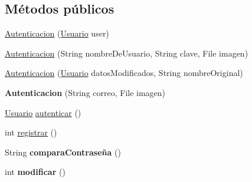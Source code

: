 \subsection*{Métodos públicos}
\begin{DoxyCompactItemize}
\item 
\hyperlink{classcom_1_1ucab_1_1javachat_1_1_servidor_1_1model_1_1_autenticacion_acf6d86eec7551760ec91cc2ad09b5e3d}{Autenticacion} (\hyperlink{classcom_1_1ucab_1_1javachat_1_1_servidor_1_1model_1_1_usuario}{Usuario} user)
\item 
\hyperlink{classcom_1_1ucab_1_1javachat_1_1_servidor_1_1model_1_1_autenticacion_ae16e9a2db61ce5528fc5d024dec17092}{Autenticacion} (String nombre\-De\-Usuario, String clave, File imagen)
\item 
\hyperlink{classcom_1_1ucab_1_1javachat_1_1_servidor_1_1model_1_1_autenticacion_a58448a0f8c2cd4186dc2bf97ef81e2f7}{Autenticacion} (\hyperlink{classcom_1_1ucab_1_1javachat_1_1_servidor_1_1model_1_1_usuario}{Usuario} datos\-Modificados, String nombre\-Original)
\item 
\hypertarget{classcom_1_1ucab_1_1javachat_1_1_servidor_1_1model_1_1_autenticacion_a73bb46aee6ae1f6741ebb4cf73763efc}{{\bfseries Autenticacion} (String correo, File imagen)}\label{classcom_1_1ucab_1_1javachat_1_1_servidor_1_1model_1_1_autenticacion_a73bb46aee6ae1f6741ebb4cf73763efc}

\item 
\hyperlink{classcom_1_1ucab_1_1javachat_1_1_servidor_1_1model_1_1_usuario}{Usuario} \hyperlink{classcom_1_1ucab_1_1javachat_1_1_servidor_1_1model_1_1_autenticacion_abd542a51e7aca4eb713e823a82b83673}{autenticar} ()
\item 
int \hyperlink{classcom_1_1ucab_1_1javachat_1_1_servidor_1_1model_1_1_autenticacion_a14e19bd0d14451bb87fd62bdd74b15d7}{registrar} ()
\item 
\hypertarget{classcom_1_1ucab_1_1javachat_1_1_servidor_1_1model_1_1_autenticacion_ae18b837b59ef28f09723e6d772b5d26d}{String {\bfseries compara\-Contraseña} ()}\label{classcom_1_1ucab_1_1javachat_1_1_servidor_1_1model_1_1_autenticacion_ae18b837b59ef28f09723e6d772b5d26d}

\item 
\hypertarget{classcom_1_1ucab_1_1javachat_1_1_servidor_1_1model_1_1_autenticacion_a8c809a9a3e8bc1cf8590aa6ec6a45285}{int {\bfseries modificar} ()}\label{classcom_1_1ucab_1_1javachat_1_1_servidor_1_1model_1_1_autenticacion_a8c809a9a3e8bc1cf8590aa6ec6a45285}

\end{DoxyCompactItemize}


